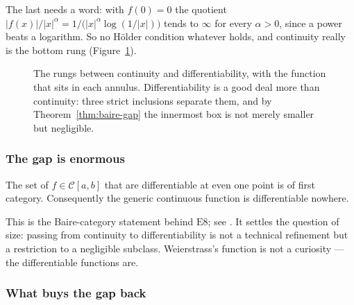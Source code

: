 \medskip
The last needs a word: with $f(0)=0$ the quotient
$|f(x)|/|x|^{\alpha} = 1/\bigl(|x|^{\alpha}\log(1/|x|)\bigr)$ tends to
$\infty$ for every $\alpha>0$, since a power beats a logarithm. So no Hölder
condition whatever holds, and continuity really is the bottom rung (Figure~\ref{fig:rungs}).

\begin{figure}[htbp]
\centering
{}
\caption{The rungs between continuity and differentiability, with the
function that sits in each annulus. Differentiability is a good deal more
than continuity: three strict inclusions separate them, and by
Theorem~\ref{thm:baire-gap} the innermost box is not merely smaller but
negligible.}
\label{fig:rungs}
\end{figure}

\subsubsection*{The gap is enormous}

\begin{theorem}\label{thm:baire-gap}
The set of $f \in \mathscr{C}[a,b]$ that are differentiable at even one point
is of first category. Consequently the generic continuous function is
differentiable nowhere.
\end{theorem}

This is the Baire-category statement behind $\mathrm{E}8$; see
\cite[Lect.~28]{yupin}. It settles the question of size: passing from
continuity to differentiability is not a technical refinement but a
restriction to a negligible subclass. Weierstrass's function is not a
curiosity --- the differentiable functions are.

\subsubsection*{What buys the gap back}

